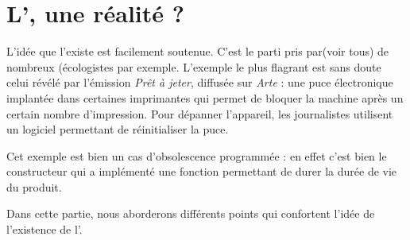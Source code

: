 \section{L'\op, une réalité ?}

L'idée que l'\op existe est facilement soutenue. C'est le parti pris par(voir tous) de nombreux (écologistes par exemple.
\smallbreak
L'exemple le plus flagrant est sans doute celui révélé par l'émission  \textit{Prêt à jeter}, diffusée sur \textit{Arte} : une puce électronique implantée dans certaines imprimantes qui permet de bloquer la machine après un certain nombre d'impression. Pour dépanner l'appareil, les journalistes utilisent un logiciel permettant de réinitialiser la puce. 

Cet exemple est bien un cas d'obsolescence programmée : en effet c'est bien le constructeur qui a implémenté une fonction permettant de durer la durée de vie du produit. 

Dans cette partie, nous aborderons différents points qui confortent l'idée de l’existence de l'\op.